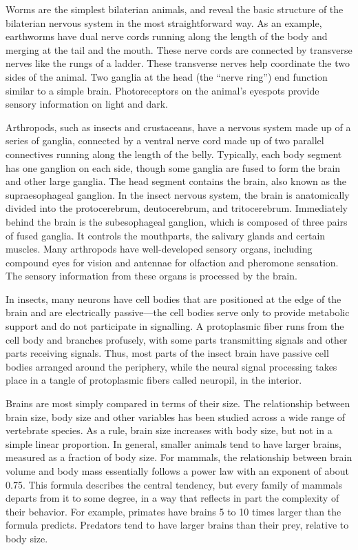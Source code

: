 \documentclass[]{book}
\begin{document}
Worms are the simplest bilaterian animals, and reveal the basic structure of the bilaterian nervous system in the most straightforward way. As an example, earthworms have dual nerve cords running along the length of the body and merging at the tail and the mouth. These nerve cords are connected by transverse nerves like the rungs of a ladder. These transverse nerves help coordinate the two sides of the animal. Two ganglia at the head (the ``nerve ring'') end function similar to a simple brain. Photoreceptors on the animal's eyespots provide sensory information on light and dark.

Arthropods, such as insects and crustaceans, have a nervous system made up of a series of ganglia, connected by a ventral nerve cord made up of two parallel connectives running along the length of the belly. Typically, each body segment has one ganglion on each side, though some ganglia are fused to form the brain and other large ganglia. The head segment contains the brain, also known as the supraesophageal ganglion. In the insect nervous system, the brain is anatomically divided into the protocerebrum, deutocerebrum, and tritocerebrum. Immediately behind the brain is the subesophageal ganglion, which is composed of three pairs of fused ganglia. It controls the mouthparts, the salivary glands and certain muscles. Many arthropods have well-developed sensory organs, including compound eyes for vision and antennae for olfaction and pheromone sensation. The sensory information from these organs is processed by the brain.

In insects, many neurons have cell bodies that are positioned at the edge of the brain and are electrically passive---the cell bodies serve only to provide metabolic support and do not participate in signalling. A protoplasmic fiber runs from the cell body and branches profusely, with some parts transmitting signals and other parts receiving signals. Thus, most parts of the insect brain have passive cell bodies arranged around the periphery, while the neural signal processing takes place in a tangle of protoplasmic fibers called neuropil, in the interior.

Brains are most simply compared in terms of their size. The relationship between brain size, body size and other variables has been studied across a wide range of vertebrate species. As a rule, brain size increases with body size, but not in a simple linear proportion. In general, smaller animals tend to have larger brains, measured as a fraction of body size. For mammals, the relationship between brain volume and body mass essentially follows a power law with an exponent of about 0.75. This formula describes the central tendency, but every family of mammals departs from it to some degree, in a way that reflects in part the complexity of their behavior. For example, primates have brains 5 to 10 times larger than the formula predicts. Predators tend to have larger brains than their prey, relative to body size.
\end{document}
